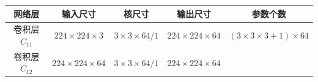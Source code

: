\begin{longtable}[]{ ccccc }
\toprule
\begin{minipage}[b]{0.16\columnwidth}\centering\strut
网络层\strut
\end{minipage} & \begin{minipage}[b]{0.15\columnwidth}\centering\strut
输入尺寸\strut
\end{minipage} & \begin{minipage}[b]{0.17\columnwidth}\centering\strut
核尺寸\strut
\end{minipage} & \begin{minipage}[b]{0.16\columnwidth}\centering\strut
输出尺寸\strut
\end{minipage} & \begin{minipage}[b]{0.22\columnwidth}\centering\strut
参数个数\strut
\end{minipage}\tabularnewline
\midrule
\endhead
\begin{minipage}[t]{0.16\columnwidth}\centering\strut
卷积层\(C_{11}\)\strut
\end{minipage} & \begin{minipage}[t]{0.15\columnwidth}\centering\strut
\(224\times224\times3\)\strut
\end{minipage} & \begin{minipage}[t]{0.17\columnwidth}\centering\strut
\(3\times3\times64/1\)\strut
\end{minipage} & \begin{minipage}[t]{0.16\columnwidth}\centering\strut
\(224\times224\times64\)\strut
\end{minipage} & \begin{minipage}[t]{0.22\columnwidth}\centering\strut
\((3\times3\times3+1)\times64\)\strut
\end{minipage}\tabularnewline
\begin{minipage}[t]{0.16\columnwidth}\centering\strut
卷积层\(C_{12}\)\strut
\end{minipage} & \begin{minipage}[t]{0.15\columnwidth}\centering\strut
\(224\times224\times64\)\strut
\end{minipage} & \begin{minipage}[t]{0.17\columnwidth}\centering\strut
\(3\times3\times64/1\)\strut
\end{minipage} & \begin{minipage}[t]{0.16\columnwidth}\centering\strut
\(224\times224\times64\)\strut
\end{minipage} & \begin{minipage}[t]{0.22\columnwidth}\centering\strut

\end{minipage}
\end{longtable}
